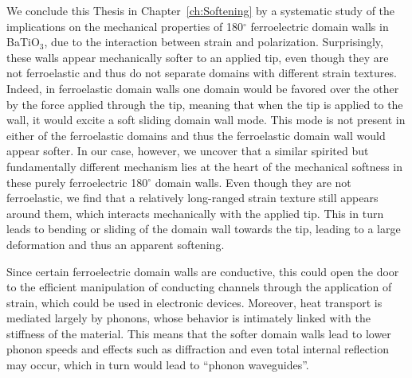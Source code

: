 We conclude this Thesis in Chapter~\ref{ch:Softening} by a systematic study of the implications on the mechanical properties of 180$^\circ$ ferroelectric domain walls in BaTiO$_3$, due to the interaction between strain and polarization.
Surprisingly, these walls appear mechanically softer to an applied tip, even though they are not ferroelastic and thus do not separate domains with different strain textures.
Indeed, in ferroelastic domain walls one domain would be favored over the other by the force applied through the tip, meaning that when the tip is applied to the wall, it would excite a soft sliding domain wall mode.
This mode is not present in either of the ferroelastic domains and thus the ferroelastic domain wall would appear softer.
In our case, however, we uncover that a similar spirited but fundamentally different mechanism lies at the heart of the mechanical softness in these purely ferroelectric 180$^\circ$ domain walls.
Even though they are not ferroelastic, we find that a relatively long-ranged strain texture still appears around them, which interacts mechanically with the applied tip.
This in turn leads to bending or sliding of the domain wall towards the tip, leading to a large deformation and thus an apparent softening.

Since certain ferroelectric domain walls are conductive, this could open the door to the efficient manipulation of conducting channels through the application of strain, which could be used in electronic devices. Moreover, heat transport is mediated largely by phonons, whose behavior is intimately linked with the stiffness of the material. This means that the softer domain walls lead to lower phonon speeds and effects such as diffraction and even total internal reflection may occur, which in turn would lead to ``phonon waveguides''.
